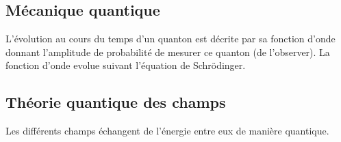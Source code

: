 \subsection{Mécanique quantique}

L'évolution au cours du temps d'un quanton est décrite par sa fonction d'onde donnant l'amplitude de probabilité de mesurer ce quanton (de l'observer). La fonction d'onde evolue suivant l'équation de Schrödinger.

\subsection{Théorie quantique des champs}

Les différents champs échangent de l'énergie entre eux de manière quantique.

